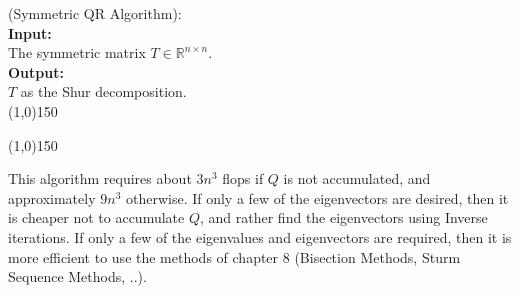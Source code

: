 \begin{algo}
{
%
	(Symmetric QR Algorithm):
%
}\\
\textbf{Input: }
{
%
	\\The symmetric matrix $T\in\mathbb R^{n\times n}$.
%
}\\
\textbf{Output: }
{
%
	\\$T$ as the Shur decomposition.
%
}\\
\line(1,0){150}
\begin{algorithmic}
%
		\EndIf{}
	\EndFor{}
	\EndIf{}
\EndWhile{}
%
\end{algorithmic}
\label{algQRAlgorithm}
\line(1,0){150}
\end{algo}
This algorithm requires about $3n^3$ flops if $Q$ is not accumulated, 
and approximately $9n^3$ otherwise.
%
If only a few of the eigenvectors are desired, then it is cheaper not to accumulate $Q$, 
and rather find the eigenvectors using Inverse iterations.
%
If only a few of the eigenvalues and eigenvectors are required, then it is more efficient to use
the methods of chapter 8 (Bisection Methods, Sturm Sequence Methods, ..).

